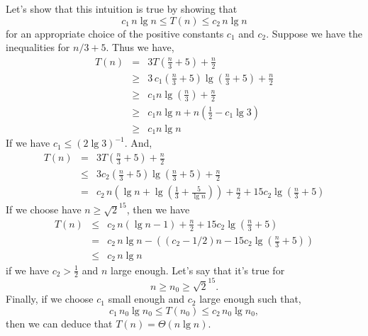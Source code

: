 \documentclass[a4paper,12pt]{article}
\begin{document}
Let's show that this intuition is true by showing that
\[ c_1\,n\lg n \le T(n) \le c_2\,n\lg n\]
for an appropriate choice of the positive constants $c_1$ and $c_2$.
Suppose we have the inequalities for $n/3 + 5$.  Thus we have,
\begin{eqnarray*}
  T(n) &=& 3T\left(\frac{n}{3} + 5\right) + \frac{n}{2} \\
  &\ge& 3\,c_1\left(\frac{n}{3} + 5\right)
  \lg\left(\frac{n}{3} + 5\right) + \frac{n}{2} \\
  &\ge& c_1n\lg\left(\frac{n}{3}\right) + \frac{n}{2} \\
  &\ge& c_1n\lg n + n\left(\frac{1}{2} - c_1\lg 3\right) \\
  &\ge& c_1n\lg n
\end{eqnarray*}
If we have $c_1 \le (2\lg 3)^{-1}$.  And,
\begin{eqnarray*}
  T(n) &=& 3T\left(\frac{n}{3} + 5\right) + \frac{n}{2} \\
  &\le& 3c_2\left(\frac{n}{3} + 5\right)
  \lg\left(\frac{n}{3} + 5\right) + \frac{n}{2} \\
  &=& c_2\,n\left(\lg n + \lg\left(\frac{1}{3} + \frac{5}{\lg
    n}\right)\right) + \frac{n}{2} + 15c_2\lg\left(\frac{n}{3} + 5\right)
\end{eqnarray*}
If we choose have $n \ge \sqrt{2}^{15}$, then we have
\begin{eqnarray*}
  T(n) &\le& c_2\,n(\lg n - 1) + \frac{n}{2} + 15c_2\lg\left(\frac{n}{3}
  + 5\right) \\
  &=& c_2\,n\lg n - \left((c_2 - 1/2) n - 15c_2\lg\left(\frac{n}{3}
  + 5\right)\right) \\
  &\le& c_2\,n\lg n
\end{eqnarray*}
if we have $c_2 > \frac{1}{2}$ and $n$ large enough.  Let's say that
it's true for
\[n \ge n_0 \ge \sqrt{2}^{15}.\]
Finally, if we choose $c_1$ small enough and $c_2$ large enough such
that,
\[ c_1\,n_0 \lg n_0 \le T(n_0) \le c_2\,n_0 \lg n_0,\]
then we can deduce that $T(n) = \Theta(n\lg n)$.
\end{document}
